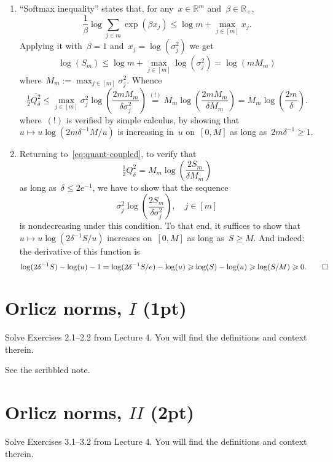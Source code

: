 \documentclass[11pt]{article}
\newcommand{\odima}[1]{{\color{red} #1}}
\newcommand{\R}{\mathds{R}}
\newcommand{\leqs}{\leqslant}
\newcommand{\geqs}{\geqslant}
\renewcommand{\le}{\leqs}
\renewcommand{\ge}{\geqs}
\begin{document}
{\begin{enumerate}
\begin{equation}
\le \max_{j \in [m]} \sigma_j^2 \log\left( \frac{2}{\delta \hat p_j} \right)
= \max_{j \in [m]} \sigma_j^2 \log\left( \frac{2 S_m}{\delta \sigma_j^2} \right)
\label{eq:quant-coupled}
\end{equation}
as required.
\item 
``Softmax inequality'' states that, for any~$x \in \R^m$ and~$\beta \in \R_+$, 
\[
\frac{1}{\beta} \log \sum_{j \in m} \exp \left(\beta x_j \right) \le \log m + \max_{j \in [m]} x_j.
\]
Applying it with~$\beta = 1$ and~$x_j = \log(\sigma_j^2)$ we get
\[
\log(S_m) \le \log m + \max_{j \in [m]} \log(\sigma_j^2) = \log (m M_m)
\]
where~$M_m := \max_{j \in [m]} \sigma_j^2$. 
Whence
\[
\tfrac{1}{2}\overline{Q_\delta^2} 
\le \max_{j \in [m]} \sigma_j^2 \log\left( \frac{2m M_m}{\delta \sigma_j^2} \right)
\stackrel{(!)}{=} M_m \log\left( \frac{2m M_m}{\delta M_m} \right) 
= M_m \log\left( \frac{2m}{\delta} \right).
\]
where~$(!)$ is verified by simple calculus, by showing that~$u \mapsto u \log(2m\delta^{-1}M/u)$ is increasing in~$u$ on~$[0,M]$ as long as~$2m\delta^{-1} \ge 1$.
\item 
Returning to~\eqref{eq:quant-coupled}, to verify that
\[
\tfrac{1}{2}Q_\delta^2 = M_m \log\left( \frac{2 S_m}{\delta M_m} \right)
\]
as long as~$\delta \le 2e^{-1}$, we have to show that the sequence
\[
\sigma_j^2 \log\left( \frac{2 S_m}{\delta \sigma_j^2} \right), \quad j \in [m]
\]
is nondecreasing under this condition. 
To that end, it suffices to show that~$u \mapsto u \log(2\delta^{-1}S/u)$ increases on~$[0,M]$ as long as~$S \ge M$. 
And indeed: the derivative of this function is
\[
\log(2\delta^{-1} S) - \log(u) - 1 = \log(2\delta^{-1} S/e) - \log(u) \ge \log(S) - \log(u) \ge \log(S/M) \ge 0. \qed
\]


\end{enumerate}
}


\newpage
\section{Orlicz norms, $I$ (1pt)}
Solve Exercises 2.1--2.2 from Lecture 4. You will find the definitions and context therein.

\odima{See the scribbled note.}

\newpage
\section{Orlicz norms, $II$ (2pt)}
Solve Exercises 3.1--3.2 from Lecture 4. You will find the definitions and context therein.
\end{document}
